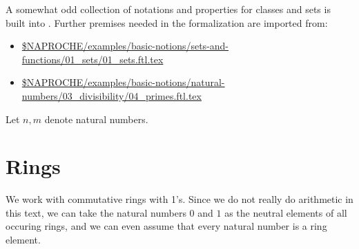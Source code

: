 \documentclass{article}
\begin{document}
A somewhat odd collection of notations and properties for classes and sets is
built into \Naproche.
Further premises needed in the formalization are imported from:

\begin{itemize}
  \item \url{$NAPROCHE/examples/basic-notions/sets-and-functions/01_sets/01_sets.ftl.tex}
  \item \url{$NAPROCHE/examples/basic-notions/natural-numbers/03_divisibility/04_primes.ftl.tex}
\end{itemize}


\begin{forthel}
  Let $n,m$ denote natural numbers.
\end{forthel}


\section{Rings}

We work with commutative rings with 1's. Since we
do not really do arithmetic in this text, we can take the natural numbers
$0$ and $1$ as the neutral elements of all occuring rings, and
we can even assume that every natural number is a ring element.
\end{document}
